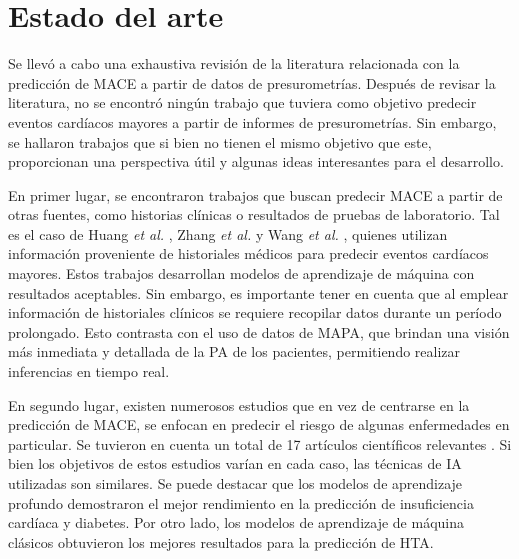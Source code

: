 
\section{Estado del arte}

Se llevó a cabo una exhaustiva revisión de la literatura relacionada con la predicción 
de MACE a partir de datos de presurometrías.
Después de revisar la literatura, no se encontró ningún trabajo que tuviera como objetivo predecir eventos 
cardíacos mayores a partir de informes de presurometrías. Sin embargo, se hallaron trabajos que si bien no 
tienen el mismo objetivo que este, proporcionan una perspectiva útil y algunas ideas interesantes
 para el desarrollo.

En primer lugar, se encontraron trabajos que buscan predecir MACE a partir de otras fuentes, como historias clínicas 
o resultados de pruebas de laboratorio. Tal es el caso de Huang \emph{et al.} \citep{CITE:11}, Zhang \emph{et al.} \citep{CITE:12} y 
Wang \emph{et al.} \citep{CITE:13}, quienes utilizan información proveniente de historiales médicos para predecir eventos 
cardíacos mayores. Estos trabajos desarrollan modelos de aprendizaje de máquina con resultados aceptables. 
Sin embargo, es importante tener en cuenta que 
al emplear información de historiales clínicos se requiere recopilar datos durante un período prolongado. 
Esto contrasta con el uso de datos de MAPA, que brindan una visión más inmediata y detallada de la PA de los pacientes, 
permitiendo realizar inferencias en tiempo real.

En segundo lugar, existen numerosos estudios que en vez de centrarse en la predicción de MACE, se enfocan en 
predecir el riesgo de algunas enfermedades en particular. Se tuvieron en cuenta un total de 17 artículos científicos 
relevantes \citep{CITE:14} \citep{CITE:15} \citep{CITE:16} \citep{CITE:17} \citep{CITE:18}
\citep{CITE:19} \citep{CITE:20} \citep{CITE:21} \citep{CITE:22} \citep{CITE:23} \citep{CITE:24}
\citep{CITE:25} \citep{CITE:26} \citep{CITE:27} \citep{CITE:28} \citep{CITE:29} \citep{CITE:30} \citep{CITE:31}.  
Si bien los objetivos de estos estudios varían en cada caso, las técnicas de IA utilizadas son similares. 
Se puede destacar que los modelos de aprendizaje profundo demostraron el mejor rendimiento en la predicción de 
insuficiencia cardíaca y diabetes. Por otro lado, los modelos de aprendizaje de máquina clásicos obtuvieron 
los mejores resultados para la predicción de HTA.

